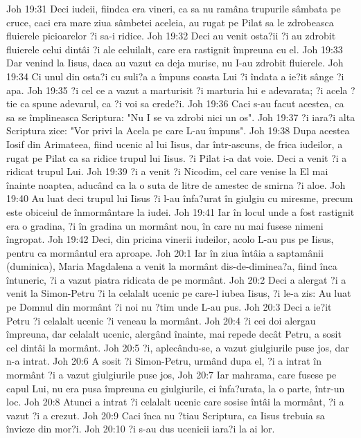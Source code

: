 Joh 19:31  Deci iudeii, fiindca era vineri, ca sa nu ramâna trupurile sâmbata pe cruce, caci era mare ziua sâmbetei aceleia, au rugat pe Pilat sa le zdrobeasca fluierele picioarelor ?i sa-i ridice.
Joh 19:32  Deci au venit osta?ii ?i au zdrobit fluierele celui dintâi ?i ale celuilalt, care era rastignit împreuna cu el.
Joh 19:33  Dar venind la Iisus, daca au vazut ca deja murise, nu I-au zdrobit fluierele.
Joh 19:34  Ci unul din osta?i cu suli?a a împuns coasta Lui ?i îndata a ie?it sânge ?i apa.
Joh 19:35  ?i cel ce a vazut a marturisit ?i marturia lui e adevarata; ?i acela ?tie ca spune adevarul, ca ?i voi sa crede?i.
Joh 19:36  Caci s-au facut acestea, ca sa se împlineasca Scriptura: "Nu I se va zdrobi nici un os".
Joh 19:37  ?i iara?i alta Scriptura zice: "Vor privi la Acela pe care L-au împuns".
Joh 19:38  Dupa acestea Iosif din Arimateea, fiind ucenic al lui Iisus, dar într-ascuns, de frica iudeilor, a rugat pe Pilat ca sa ridice trupul lui Iisus. ?i Pilat i-a dat voie. Deci a venit ?i a ridicat trupul Lui.
Joh 19:39  ?i a venit ?i Nicodim, cel care venise la El mai înainte noaptea, aducând ca la o suta de litre de amestec de smirna ?i aloe.
Joh 19:40  Au luat deci trupul lui Iisus ?i l-au înfa?urat în giulgiu cu miresme, precum este obiceiul de înmormântare la iudei.
Joh 19:41  Iar în locul unde a fost rastignit era o gradina, ?i în gradina un mormânt nou, în care nu mai fusese nimeni îngropat.
Joh 19:42  Deci, din pricina vinerii iudeilor, acolo L-au pus pe Iisus, pentru ca mormântul era aproape.
Joh 20:1  Iar în ziua întâia a saptamânii (duminica), Maria Magdalena a venit la mormânt dis-de-diminea?a, fiind înca întuneric, ?i a vazut piatra ridicata de pe mormânt.
Joh 20:2  Deci a alergat ?i a venit la Simon-Petru ?i la celalalt ucenic pe care-l iubea Iisus, ?i le-a zis: Au luat pe Domnul din mormânt ?i noi nu ?tim unde L-au pus.
Joh 20:3  Deci a ie?it Petru ?i celalalt ucenic ?i veneau la mormânt.
Joh 20:4  ?i cei doi alergau împreuna, dar celalalt ucenic, alergând înainte, mai repede decât Petru, a sosit cel dintâi la mormânt.
Joh 20:5  ?i, aplecându-se, a vazut giulgiurile puse jos, dar n-a intrat.
Joh 20:6  A sosit ?i Simon-Petru, urmând dupa el, ?i a intrat în mormânt ?i a vazut giulgiurile puse jos,
Joh 20:7  Iar mahrama, care fusese pe capul Lui, nu era pusa împreuna cu giulgiurile, ci înfa?urata, la o parte, într-un loc.
Joh 20:8  Atunci a intrat ?i celalalt ucenic care sosise întâi la mormânt, ?i a vazut ?i a crezut.
Joh 20:9  Caci înca nu ?tiau Scriptura, ca Iisus trebuia sa învieze din mor?i.
Joh 20:10  ?i s-au dus ucenicii iara?i la ai lor.
